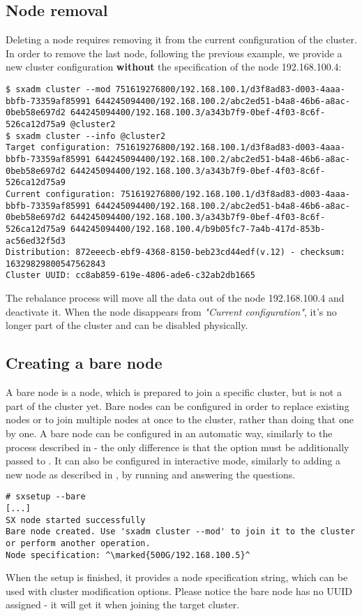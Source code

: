 \subsection{Node removal}
Deleting a node requires removing it from the current configuration of the
cluster. In order to remove the last node, following the previous example,
we provide a new cluster configuration \textbf{without} the specification
of the node 192.168.100.4:
\begin{lstlisting}
$ sxadm cluster --mod 751619276800/192.168.100.1/d3f8ad83-d003-4aaa-bbfb-73359af85991 644245094400/192.168.100.2/abc2ed51-b4a8-46b6-a8ac-0beb58e697d2 644245094400/192.168.100.3/a343b7f9-0bef-4f03-8c6f-526ca12d75a9 @cluster2
$ sxadm cluster --info @cluster2
Target configuration: 751619276800/192.168.100.1/d3f8ad83-d003-4aaa-bbfb-73359af85991 644245094400/192.168.100.2/abc2ed51-b4a8-46b6-a8ac-0beb58e697d2 644245094400/192.168.100.3/a343b7f9-0bef-4f03-8c6f-526ca12d75a9 
Current configuration: 751619276800/192.168.100.1/d3f8ad83-d003-4aaa-bbfb-73359af85991 644245094400/192.168.100.2/abc2ed51-b4a8-46b6-a8ac-0beb58e697d2 644245094400/192.168.100.3/a343b7f9-0bef-4f03-8c6f-526ca12d75a9 644245094400/192.168.100.4/b9b05fc7-7a4b-417d-853b-ac56ed32f5d3 
Distribution: 872eeecb-ebf9-4368-8150-beb23cd44edf(v.12) - checksum: 16329829800547562843
Cluster UUID: cc8ab859-619e-4806-ade6-c32ab2db1665
\end{lstlisting}
The rebalance process will move all the data out of the node 192.168.100.4 and
deactivate it. When the node disappears from \emph{"Current configuration"}, it's no
longer part of the cluster and can be disabled physically.

\subsection{Creating a bare node}
A bare node is a node, which is prepared to join a specific cluster, but is
not a part of the cluster yet. Bare nodes can be configured in order to
replace existing nodes or to join multiple nodes at once to the cluster,
rather than doing that one by one. A bare node can be configured in an
automatic way, similarly to the process described in 
- the only difference is that the option  must be additionally
passed to . It can also be configured in interactive mode,
similarly to adding a new node as described in , by
running  and answering the questions.
\begin{lstlisting}
# sxsetup --bare
[...]
SX node started successfully
Bare node created. Use 'sxadm cluster --mod' to join it to the cluster
or perform another operation.
Node specification: ^\marked{500G/192.168.100.5}^
\end{lstlisting}
When the setup is finished, it provides a node specification string, which
can be used with cluster modification options. Please notice the bare node
has no UUID assigned - it will get it when joining the target cluster.

